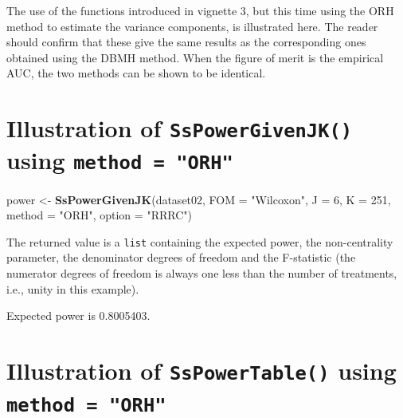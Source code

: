\documentclass[]{book}
\newenvironment{Shaded}{\begin{snugshade}}{\end{snugshade}}
\newcommand{\CommentTok}[1]{\textcolor[rgb]{0.56,0.35,0.01}{\textit{#1}}}
\newcommand{\DataTypeTok}[1]{\textcolor[rgb]{0.13,0.29,0.53}{#1}}
\newcommand{\DecValTok}[1]{\textcolor[rgb]{0.00,0.00,0.81}{#1}}
\newcommand{\KeywordTok}[1]{\textcolor[rgb]{0.13,0.29,0.53}{\textbf{#1}}}
\newcommand{\NormalTok}[1]{#1}
\newcommand{\StringTok}[1]{\textcolor[rgb]{0.31,0.60,0.02}{#1}}
\begin{document}
The use of the functions introduced in vignette 3, but this time using the ORH method to estimate the variance components, is illustrated here. The reader should confirm that these give the same results as the corresponding ones obtained using the DBMH method. When the figure of merit is the empirical AUC, the two methods can be shown to be identical.

\hypertarget{illustration-of-sspowergivenjk-using-method-orh}{%
\section{\texorpdfstring{Illustration of \texttt{SsPowerGivenJK()} using \texttt{method\ =\ "ORH"}}{Illustration of SsPowerGivenJK() using method = "ORH"}}\label{illustration-of-sspowergivenjk-using-method-orh}}

\begin{Shaded}
\begin{Highlighting}[]
\NormalTok{power <-}\StringTok{ }\KeywordTok{SsPowerGivenJK}\NormalTok{(dataset02, }\DataTypeTok{FOM =} \StringTok{"Wilcoxon"}\NormalTok{, }\DataTypeTok{J =} \DecValTok{6}\NormalTok{, }\DataTypeTok{K =} \DecValTok{251}\NormalTok{, }\DataTypeTok{method =} \StringTok{"ORH"}\NormalTok{, }\DataTypeTok{option =} \StringTok{"RRRC"}\NormalTok{)}
\end{Highlighting}
\end{Shaded}

The returned value is a \texttt{list} containing the expected power, the non-centrality parameter, the denominator degrees of freedom and the F-statistic (the numerator degrees of freedom is always one less than the number of treatments, i.e., unity in this example).

\begin{Shaded}
\end{Shaded}

Expected power is 0.8005403.

\hypertarget{illustration-of-sspowertable-using-method-orh}{%
\section{\texorpdfstring{Illustration of \texttt{SsPowerTable()} using \texttt{method\ =\ "ORH"}}{Illustration of SsPowerTable() using method = "ORH"}}\label{illustration-of-sspowertable-using-method-orh}}
\end{document}
